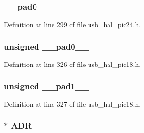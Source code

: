 \subsubsection[{\+\_\+\+\_\+pad0\+\_\+\+\_\+}]{ \+\_\+\+\_\+pad0\+\_\+\+\_\+}\label{union_____b_d_t_af4319e81938c5bba16d3bdc146991408}


Definition at line 299 of file usb\+\_\+hal\+\_\+pic24.\+h.

\hypertarget{union_____b_d_t_adf71f3d8410c1f1dbbc96680a92c49af}{}
\subsubsection[{\+\_\+\+\_\+pad0\+\_\+\+\_\+}]{\setlength{\rightskip}{0pt plus 5cm}unsigned \+\_\+\+\_\+pad0\+\_\+\+\_\+}\label{union_____b_d_t_adf71f3d8410c1f1dbbc96680a92c49af}


Definition at line 326 of file usb\+\_\+hal\+\_\+pic18.\+h.

\hypertarget{union_____b_d_t_acaf2d0924a107ec6e8d2e31febaf66f9}{}
\subsubsection[{\+\_\+\+\_\+pad1\+\_\+\+\_\+}]{\setlength{\rightskip}{0pt plus 5cm}unsigned \+\_\+\+\_\+pad1\+\_\+\+\_\+}\label{union_____b_d_t_acaf2d0924a107ec6e8d2e31febaf66f9}


Definition at line 327 of file usb\+\_\+hal\+\_\+pic18.\+h.

\hypertarget{union_____b_d_t_af72689b61b0108586139eb99c10aa22e}{}
\subsubsection[{A\+D\+R}]{$\ast$ A\+D\+R}\label{union_____b_d_t_af72689b61b0108586139eb99c10aa22e}


